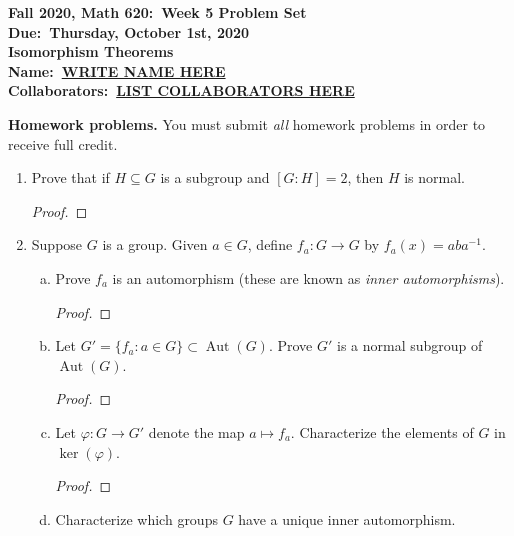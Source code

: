 \documentclass{article}
\theoremstyle{definition}
\numberwithin{equation}{section}
\renewcommand\>{\rangle}
\newcommand\<{\langle}
\newcommand\0{\mathbf{0}}
\DeclareMathOperator\Aut{Aut} %
\begin{document}
\begin{center}
\textbf{Fall 2020, Math 620:\ Week 5 Problem Set} \\
\textbf{Due:\ Thursday, October 1st, 2020} \\
\textbf{Isomorphism Theorems} \\
\textbf{Name:\ \underline{WRITE NAME HERE}} \\
\textbf{Collaborators:\ \underline{LIST COLLABORATORS HERE}}
\end{center}


\bigskip
\noindent
\textbf{Homework problems.}
You must submit \emph{all} homework problems in order to receive full credit.  

\begin{enumerate}[(H1)]
\item 
Prove that if $H \subseteq G$ is a subgroup and $[G:H] = 2$, then $H$ is normal.  

\begin{proof}

\end{proof}


\item 
Suppose $G$ is a group.  Given $a \in G$, define $f_a:G \to G$ by $f_a(x) = aba^{-1}$.  
\begin{enumerate}[(a)]
\item 
Prove $f_a$ is an automorphism (these are known as \emph{inner automorphisms}).  

\begin{proof}

\end{proof}


\item 
Let $G' = \{f_a : a \in G\} \subset \Aut(G)$.  Prove $G'$ is a normal subgroup of $\Aut(G)$.  

\begin{proof}

\end{proof}


\item 
Let $\varphi:G \to G'$ denote the map $a \mapsto f_a$.  Characterize the elements of $G$ in $\ker(\varphi)$.  

\begin{proof}

\end{proof}


\item 
Characterize which groups $G$ have a unique inner automorphism.  


\end{enumerate}
\end{enumerate}
\end{document}
